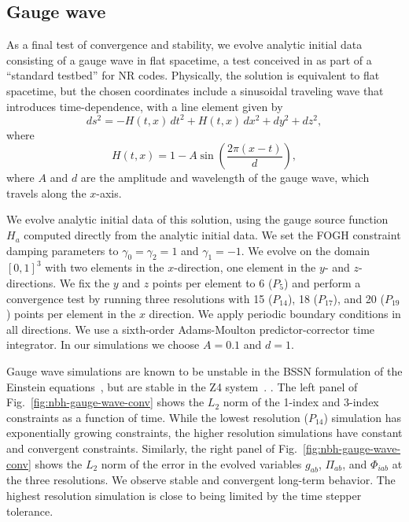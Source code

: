 \begin{bibunit}[unsrtnat]
\subsection{Gauge wave\label{sec:gauge wave}}
As a final test of convergence and stability, we evolve analytic initial data
consisting of a gauge wave in flat spacetime, a test conceived in
\cite{Alcubierre:2003pc} as part of a ``standard testbed'' for
NR codes. Physically, the solution is equivalent to flat
spacetime, but the chosen coordinates include a sinusoidal traveling wave that
introduces time-dependence, with a line element given by
\begin{equation}
  ds^2 = -H(t,x)\,dt^2 + H(t,x)\,dx^2 + dy^2 + dz^2,
\end{equation}
where
\begin{equation}
  H(t,x)=1 - A \sin\left(\frac{2\pi\left(x-t\right)}{d}\right),
\end{equation}
where $A$ and $d$ are the amplitude and wavelength of the gauge wave, which
travels along the $x$-axis.

We evolve analytic initial data of this solution, using the gauge source
function $H_a$ computed directly from the analytic initial data. We set the FOGH
constraint damping parameters to $\gamma_0=\gamma_2=1$ and $\gamma_1=-1$. We
evolve on the domain $[0, 1]^3$ with two elements in the $x$-direction, one
element in the $y$- and $z$-directions. We fix the $y$ and $z$ points per
element to 6 ($P_5$) and perform a convergence test by running three resolutions
with 15 ($P_{14}$), 18 ($P_{17}$), and 20 ($P_{19}$) points per element in the
$x$ direction. We apply periodic boundary conditions in all directions. We use a
sixth-order Adams-Moulton predictor-corrector time integrator. In our
simulations we choose $A=0.1$ and $d=1$.

Gauge wave simulations are known to be unstable in the BSSN formulation of the
Einstein equations~\cite{Babiuc:2007vr}, but are stable in the Z4
system~\cite{Alic:2011gg}. .
The left panel of Fig.~\ref{fig:nbh-gauge-wave-conv} shows the $L_2$ norm of
the 1-index and 3-index constraints as a function of time. While the lowest
resolution ($P_{14}$) simulation has exponentially growing constraints, the
higher resolution simulations have constant and convergent
constraints. Similarly, the right panel of Fig.~\ref{fig:nbh-gauge-wave-conv}
shows the $L_2$ norm of the error in the evolved variables $g_{ab}$, $\Pi_{ab}$,
and $\Phi_{iab}$ at the three resolutions. We observe stable and convergent
long-term behavior. The highest resolution simulation is close to being limited
by the time stepper tolerance.


\end{bibunit}
